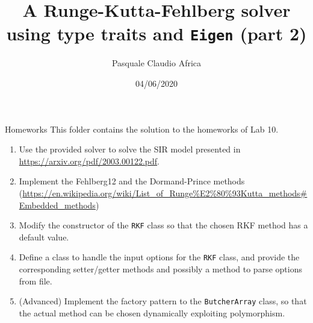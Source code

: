 \documentclass[10pt]{beamer}
\begin{document}
    \title{A Runge-Kutta-Fehlberg solver\protect\\ using type traits and \texttt{Eigen} (part 2)}
    \author{Pasquale Claudio Africa}
    \date{04/06/2020}

\begin{frame}
    \maketitle
\end{frame}

\begin{frame}{Homeworks}
This folder contains the solution to the homeworks of Lab 10.
\begin{enumerate}
\item Use the provided solver to solve the SIR model presented in \url{https://arxiv.org/pdf/2003.00122.pdf}.
\item Implement the Fehlberg12 and the Dormand-Prince methods (\url{https://en.wikipedia.org/wiki/List_of_Runge\%E2\%80\%93Kutta_methods\#Embedded_methods})
\item Modify the constructor of the \texttt{RKF} class so that the chosen RKF method has a default value.

\item Define a class to handle the input options for the \texttt{RKF} class, and provide the corresponding setter/getter methods and possibly a method to parse options from file.

\item (Advanced) Implement the factory pattern to the \texttt{ButcherArray} class, so that the actual method can be chosen dynamically exploiting polymorphism.
\end{enumerate}
\end{frame}
\end{document}
